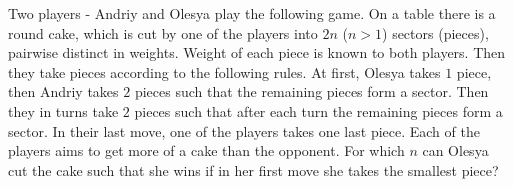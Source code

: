Two players - Andriy and Olesya play the following game. On a table there is a round cake, which is cut by one of the players into $2n$ ($n>1$) sectors (pieces), pairwise distinct in weights. Weight of each piece is known to both players. Then they take pieces according to the following rules. At first, Olesya takes $1$ piece, then Andriy takes $2$ pieces such that the remaining pieces form a sector. Then they in turns take $2$ pieces such that after each turn the remaining pieces form a sector. In their last move, one of the players takes one last piece. Each of the players aims to get more of a cake than the opponent. For which $n$ can Olesya cut the cake such that she wins if in her first move she takes the smallest piece?